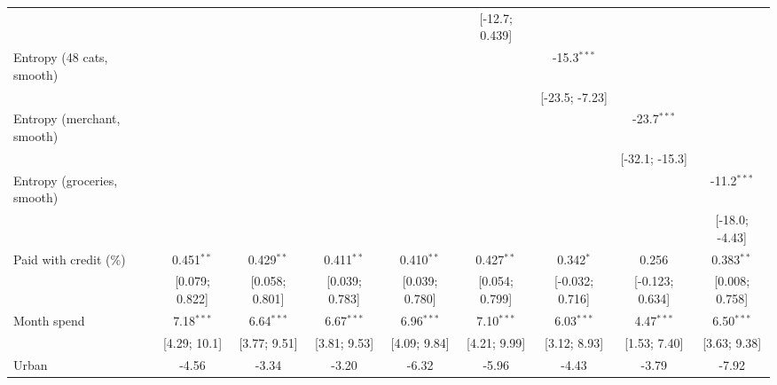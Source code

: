 \begin{table}[htbp]
\begin{threeparttable}[b]
\begin{tabular}{lcccccccc}
                                     &                 &                 &                 &                 & [-12.7; 0.439]  &                 &                 &   \\   
         Entropy (48 cats, smooth)   &                 &                 &                 &                 &                 & -15.3$^{***}$   &                 &   \\   
                                     &                 &                 &                 &                 &                 & [-23.5; -7.23]  &                 &   \\   
         Entropy (merchant, smooth)  &                 &                 &                 &                 &                 &                 & -23.7$^{***}$   &   \\   
                                     &                 &                 &                 &                 &                 &                 & [-32.1; -15.3]  &   \\   
         Entropy (groceries, smooth) &                 &                 &                 &                 &                 &                 &                 & -11.2$^{***}$\\   
                                     &                 &                 &                 &                 &                 &                 &                 & [-18.0; -4.43]\\   
         Paid with credit (\%)       & 0.451$^{**}$    & 0.429$^{**}$    & 0.411$^{**}$    & 0.410$^{**}$    & 0.427$^{**}$    & 0.342$^{*}$     & 0.256           & 0.383$^{**}$\\   
                                     & [0.079; 0.822]  & [0.058; 0.801]  & [0.039; 0.783]  & [0.039; 0.780]  & [0.054; 0.799]  & [-0.032; 0.716] & [-0.123; 0.634] & [0.008; 0.758]\\   
         Month spend                 & 7.18$^{***}$    & 6.64$^{***}$    & 6.67$^{***}$    & 6.96$^{***}$    & 7.10$^{***}$    & 6.03$^{***}$    & 4.47$^{***}$    & 6.50$^{***}$\\   
                                     & [4.29; 10.1]    & [3.77; 9.51]    & [3.81; 9.53]    & [4.09; 9.84]    & [4.21; 9.99]    & [3.12; 8.93]    & [1.53; 7.40]    & [3.63; 9.38]\\   
         Urban                       & -4.56           & -3.34           & -3.20           & -6.32           & -5.96           & -4.43           & -3.79           & -7.92\\   

\end{tabular}
\end{threeparttable}
\end{table}
